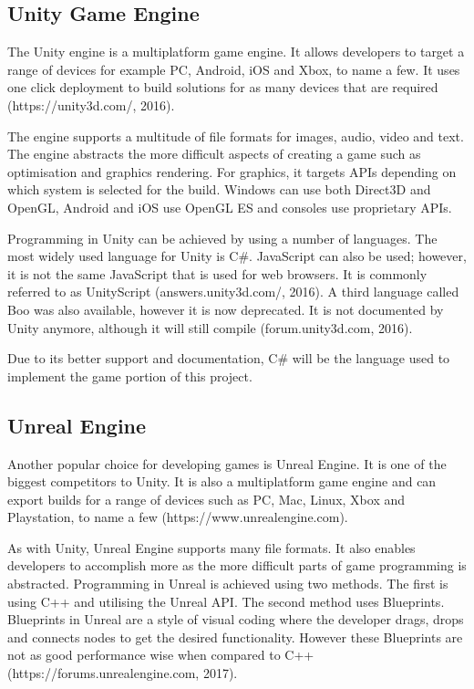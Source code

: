 \documentclass[12pt]{article}
\begin{document}
\subsection{Unity Game Engine}
The Unity engine is a multiplatform game engine. It allows developers to target a range of devices for example PC, Android, iOS and Xbox, to name a few. It uses one click deployment to build solutions for as many devices that are required (https://unity3d.com/, 2016).

The engine supports a multitude of file formats for images, audio, video and text. The engine abstracts the more difficult aspects of creating a game such as optimisation and graphics rendering. For graphics, it targets APIs depending on which system is selected for the build. Windows can use both Direct3D and OpenGL, Android and iOS use OpenGL ES and consoles use proprietary APIs.

Programming in Unity can be achieved by using a number of languages. The most widely used language for Unity is C{\#}. JavaScript can also be used; however, it is not the same JavaScript that is used for web browsers. It is commonly referred to as UnityScript (answers.unity3d.com/, 2016). A third language called Boo was also available, however it is now deprecated. It is not documented by Unity anymore, although it will still compile (forum.unity3d.com, 2016).

Due to its better support and documentation, C{\#} will be the language used to implement the game portion of this project.

\subsection{Unreal Engine}
Another popular choice for developing games is Unreal Engine. It is one of the biggest competitors to Unity. It is also a multiplatform game engine and can export builds for a range of devices such as PC, Mac, Linux, Xbox and Playstation, to name a few (https://www.unrealengine.com).

As with Unity, Unreal Engine supports many file formats. It also enables developers to accomplish more as the more difficult parts of game programming is abstracted. Programming in Unreal is achieved using two methods. The first is using C++ and utilising the Unreal API. The second method uses Blueprints. Blueprints in Unreal are a style of visual coding where the developer drags, drops and connects nodes to get the desired functionality. However these Blueprints are not as good performance wise when compared to C++ (https://forums.unrealengine.com, 2017). 
\end{document}
